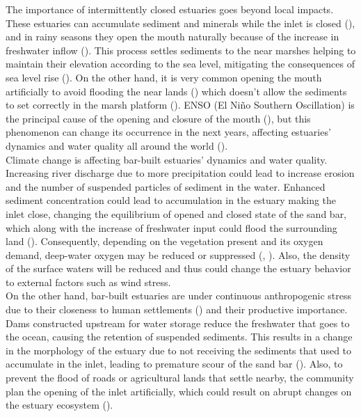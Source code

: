 \documentclass[tesis.tex]{subfiles}
\begin{document}
The importance of intermittently closed estuaries goes beyond local impacts. These estuaries can accumulate sediment and minerals while the inlet is closed (\cite{thorne2021wetlands}), and in rainy seasons they open the mouth naturally because of the increase in freshwater inflow (\cite{hoeksema2018factors}). This process settles sediments to the near marshes helping to maintain their elevation according to the sea level, mitigating the consequences of sea level rise (\cite{thorne2021wetlands}). On the other hand, it is very common opening the mouth artificially to avoid flooding the near lands (\cite{Behrens2013}) which doesn't allow the sediments to set correctly in the marsh platform  (\cite{thorne2021wetlands}). ENSO (El Niño Southern Oscillation) is the principal cause of the opening and closure of the mouth (\cite{mcsweeney2017intermittently}), but this phenomenon can change its occurrence in the next years, affecting estuaries' dynamics and water quality all around the world (\cite{thorne2021wetlands}).\\

Climate change is affecting bar-built estuaries' dynamics and water quality. Increasing river discharge due to more precipitation could lead to increase erosion and the number of suspended particles of sediment in the water. Enhanced sediment concentration could lead to accumulation in the estuary making the inlet close, changing the equilibrium of opened and closed state of the sand bar, which along with the increase of freshwater input could flood the surrounding land (\cite{peeters2009currents}). Consequently, depending on the vegetation present and its oxygen demand, deep-water oxygen may be reduced or suppressed (\cite{Kelly2018}, \cite{Largier2021}). Also, the density of the surface waters will be reduced and thus could change the estuary behavior to external factors such as wind stress. \\

On the other hand, bar-built estuaries are under continuous anthropogenic stress due to their closeness to human settlements (\cite{clark2019systematic}) and their productive importance. Dams constructed upstream for water storage reduce the freshwater that goes to the ocean, causing the retention of suspended sediments. This results in a change in the morphology of the estuary due to not receiving the sediments that used to accumulate in the inlet, leading to premature scour of the sand bar (\cite{peeters2009currents}). Also, to prevent the flood of roads or agricultural lands that settle nearby, the community plan the opening of the inlet artificially, which could result on abrupt changes on the estuary ecosystem (\cite{Behrens2013}). \\
\end{document}
